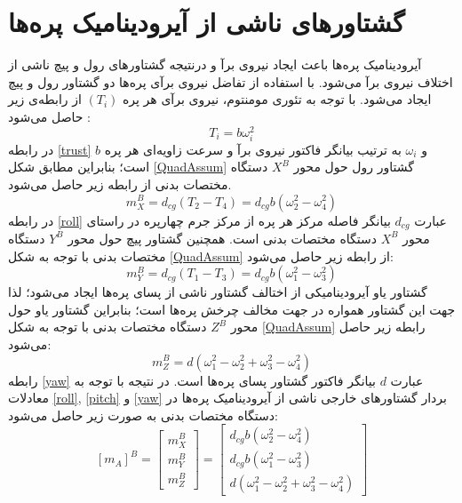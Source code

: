 \section{گشتاورهای ناشی از آيرودينامیک پره‌ها}
آیرودینامیک پره‌ها باعث ایجاد نیروی برآ و درنتیجه گشتاورهای رول و پیچ ناشی از اختلاف نیروی 
برآ می‌شود. با استفاده از تفاضل نیروی برآی پره‌ها دو گشتاور رول و پیچ ایجاد می‌شود. با توجه به تئوری مومنتوم، نیروی برآی هر پره 
$(T_i)$
از رابطه‌ی زیر حاصل می‌شود
\cite{Sharifi}
:
\begin{equation}\label{trust}
	T_i = b\omega_i^2
\end{equation}
در رابطه
\ref{trust}
$b$
و 
$\omega_i$
به ترتیب بیانگر فاکتور نیروی برآ و سرعت زاویه‌ای هر پره است؛ بنابراین مطابق شکل 
\ref{QuadAssum}
گشتاور رول حول محور
$X^B$
دستگاه مختصات بدنی از رابطه زیر حاصل می‌شود.
\begin{equation}\label{roll}
	m_X^B = d_{cg}(T_2-T_4) = d_{cg}b(\omega_2^2-\omega_4^2)
\end{equation}
در رابطه 
\ref{roll}
عبارت 
$d_{cg}$
بیانگر فاصله مرکز هر پره از مرکز جرم چهارپره در راستای محور
$X^B$
دستگاه مختصات بدنی است. همچنین گشتاور پیچ حول محور 
$Y^B$
دستگاه مختصات بدنی با توجه به شكل
\ref{QuadAssum}
از رابطه زیر حاصل می‌شود:
\begin{equation}\label{pitch}
	m_Y^B = d_{cg}(T_1-T_3) = d_{cg}b(\omega_1^2-\omega_3^2)
\end{equation}
گشتاور یاو آیرودینامیكی از اختالف گشتاور ناشی از پسای پره‌ها ایجاد می‌شود؛ لذا جهت این 
گشتاور همواره در جهت مخالف چرخش پره‌ها است؛ بنابراین گشتاور یاو حول محور
$Z^B$
دستگاه مختصات بدنی با توجه به شكل
\ref{QuadAssum}
رابطه زیر حاصل می‌شود:
\begin{equation}\label{yaw}
	m_Z^B = d(\omega_1^2-\omega_2^2+\omega_3^2-\omega_4^2)
\end{equation}
رابطه 
\ref{yaw}
عبارت 
$d$
بیانگر فاکتور گشتاور پسای پره‌ها است. در نتیجه با توجه به معادلات
\ref{roll},
\ref{pitch}
و
\ref{yaw}
بردار گشتاورهای خارجی ناشی از آیرودینامیک پره‌ها در دستگاه مختصات بدنی به صورت زیر حاصل می‌شود:
\begin{equation}\label{finaltorque}
	\left[m_A\right]^B = \begin{bmatrix}
		m_X^B\\m_Y^B\\m_Z^B
	\end{bmatrix}
 =  \begin{bmatrix}
 	d_{cg}b(\omega_2^2-\omega_4^2)\\
 	d_{cg}b(\omega_1^2-\omega_3^2)\\
 	d(\omega_1^2-\omega_2^2+\omega_3^2-\omega_4^2)
 \end{bmatrix}
\end{equation}